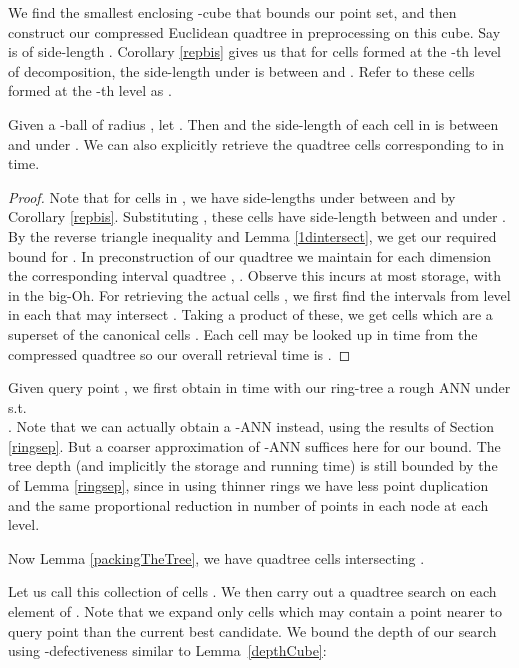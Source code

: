 \documentclass[11pt]{myclass}
\begin{document}
We find the smallest enclosing -cube  that bounds our point set, 
and then construct our compressed Euclidean quadtree in preprocessing on this cube.  Say 
is of side-length .
Corollary \ref{repbis} gives us that for cells formed at the -th level of decomposition, 
the side-length under  is between  and . Refer to these cells formed at the -th level as .

\begin{lemma}\label{packingTheTree}
Given a -ball  of radius , let . 
Then  and the side-length of each cell in  is between  and  under . 
We can also explicitly retrieve the quadtree cells corresponding to  in  time.
\end{lemma}

\begin{proof}
Note that for cells in , we have side-lengths under  between  and  by Corollary \ref{repbis}.
 Substituting ,  these cells have side-length between  and  under . 
By the reverse triangle inequality and Lemma \ref{1dintersect}, we get our required bound for .
In preconstruction of our quadtree  we maintain for each dimension the corresponding interval quadtree , . 
Observe this incurs at most  storage, with  in the big-Oh.  For retrieving the actual cells , we first
find the  intervals from level  in each  that may intersect . Taking a product of these, we get  cells 
which are a superset of the canonical cells . Each cell may be looked up in  time from the compressed
 quadtree \cite{snotes} so our overall retrieval time is .
\end{proof}


 Given query point , we first obtain in  time with our ring-tree a rough  ANN  
under  s.t. \\ .
Note that we can actually obtain a -ANN instead, using the results of Section \ref{ringsep}. But a coarser approximation
of -ANN suffices here for our bound. The tree depth (and implicitly the storage and running time) is still bounded
by the  of Lemma \ref{ringsep}, since in using thinner rings we have less point duplication
and the same proportional reduction in number of points in each node at each level.


Now Lemma \ref{packingTheTree}, we have  quadtree cells intersecting  .

 Let us call this collection of cells .  We then carry out a quadtree search on each element of . Note that
 we expand only cells which may contain a point nearer to query point  than the current best candidate.  
We bound the depth of our search using -defectiveness similar to Lemma~\ref{depthCube}:
\end{document}
